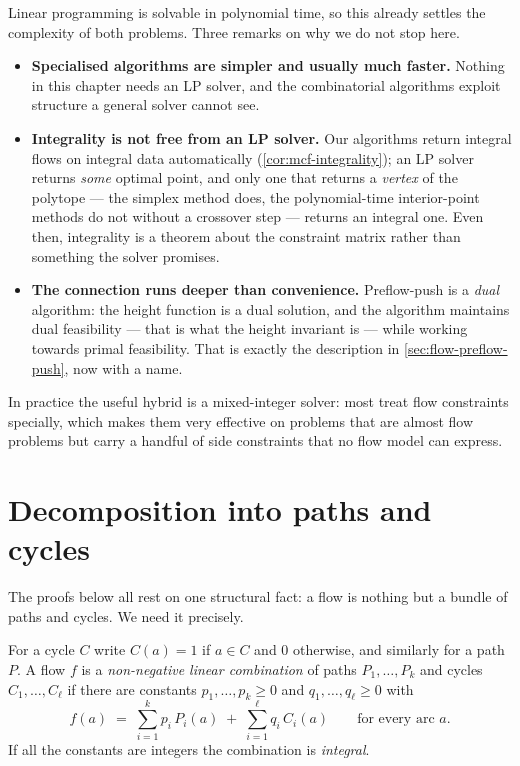 Linear programming is solvable in polynomial time, so this already settles the
complexity of both problems. Three remarks on why we do not stop here.

\begin{itemize}[leftmargin=*]
  \item \textbf{Specialised algorithms are simpler and usually much faster.}
        Nothing in this chapter needs an LP solver, and the combinatorial
        algorithms exploit structure a general solver cannot see.
  \item \textbf{Integrality is not free from an LP solver.} Our algorithms
        return integral flows on integral data automatically
        (\cref{cor:mcf-integrality}); an LP solver returns \emph{some} optimal
        point, and only one that returns a \emph{vertex} of the polytope ---
        the simplex method does, the polynomial-time interior-point methods do
        not without a crossover step --- returns an integral one. Even then,
        integrality is a theorem about the constraint matrix rather than
        something the solver promises.
  \item \textbf{The connection runs deeper than convenience.} Preflow-push is a
        \emph{dual} algorithm: the height function is a dual solution, and the
        algorithm maintains dual feasibility --- that is what the height
        invariant is --- while working towards primal feasibility. That is
        exactly the description in \cref{sec:flow-preflow-push}, now with a
        name.
\end{itemize}

In practice the useful hybrid is a mixed-integer solver: most treat flow
constraints specially, which makes them very effective on problems that are
almost flow problems but carry a handful of side constraints that no flow model
can express.

\section{Decomposition into paths and cycles}
\label{sec:mcf-decomposition}

The proofs below all rest on one structural fact: a flow is nothing but a bundle
of paths and cycles. We need it precisely.

\begin{definition}
For a cycle $C$ write $C(a) = 1$ if $a \in C$ and $0$ otherwise, and similarly
for a path $P$. A flow $f$ is a \emph{non-negative linear combination} of paths
$P_1,\ldots,P_k$ and cycles $C_1,\ldots,C_\ell$ if there are constants
$p_1,\ldots,p_k \ge 0$ and $q_1,\ldots,q_\ell \ge 0$ with
\[ f(a) \;=\; \sum_{i=1}^{k} p_i \, P_i(a) \;+\; \sum_{i=1}^{\ell} q_i \, C_i(a)
   \qquad \text{for every arc } a. \]
If all the constants are integers the combination is \emph{integral}.
\end{definition}

